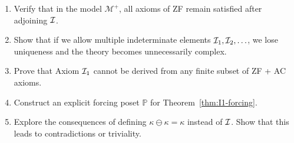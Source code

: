 \begin{enumerate}
    \item Verify that in the model $\mathcal{M}^+$, all axioms of ZF remain satisfied after adjoining $\mathcal{I}$.
    
    \item Show that if we allow multiple indeterminate elements $\mathcal{I}_1, \mathcal{I}_2, \ldots$, we lose uniqueness and the theory becomes unnecessarily complex.
    
    \item Prove that Axiom $\mathcal{I}_1$ cannot be derived from any finite subset of ZF + AC axioms.
    
    \item Construct an explicit forcing poset $\mathbb{P}$ for Theorem~\ref{thm:I1-forcing}.
    
    \item Explore the consequences of defining $\kappa \ominus \kappa = \kappa$ instead of $\mathcal{I}$. Show that this leads to contradictions or triviality.
\end{enumerate}
